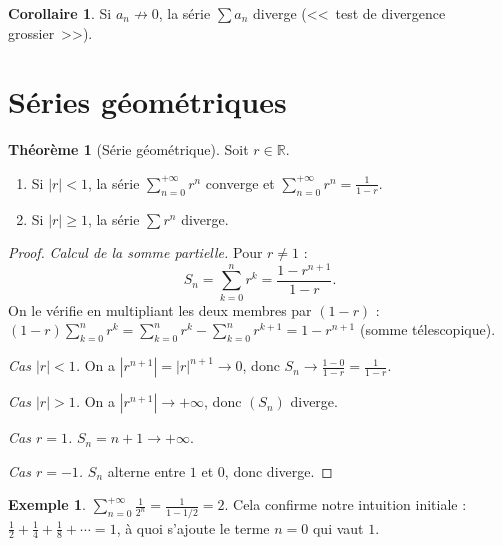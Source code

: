 \documentclass[12pt,a4paper,openany]{book}
\theoremstyle{definition}
\newtheorem{theoreme}{Théorème}[chapter]
\newtheorem{corollaire}{Corollaire}[chapter]
\newtheorem{exemple}{Exemple}[chapter]
\newcommand{\R}{\mathbb{R}}
\newcommand{\abs}[1]{\left\lvert #1 \right\rvert}
\begin{document}
\begin{corollaire}\label{cor:CN-test-divergence}
  Si $a_n \not\to 0$, la série $\sum a_n$ diverge (<<~test de divergence grossier~>>).
\end{corollaire}

\section{Séries géométriques}\label{sec:series:geometriques}

\begin{theoreme}[Série géométrique]\label{thm:serie-geometrique}
  Soit $r \in \R$.
  \begin{enumerate}[label=(\roman*)]
    \item Si $\abs{r} < 1$, la série $\sum_{n=0}^{+\infty} r^n$ converge et
      $\displaystyle\sum_{n=0}^{+\infty} r^n = \frac{1}{1 - r}$.
    \item Si $\abs{r} \geq 1$, la série $\sum r^n$ diverge.
  \end{enumerate}
\end{theoreme}

\begin{proof}
  \textit{Calcul de la somme partielle.} Pour $r \neq 1$ :
  \[
    S_n = \sum_{k=0}^{n} r^k = \frac{1 - r^{n+1}}{1 - r}.
  \]
  On le vérifie en multipliant les deux membres par $(1 - r)$ :
  $(1 - r)\sum_{k=0}^{n} r^k = \sum_{k=0}^{n} r^k - \sum_{k=0}^{n} r^{k+1}
  = 1 - r^{n+1}$ (somme télescopique).

  \textit{Cas $\abs{r} < 1$.} On a $\abs{r^{n+1}} = \abs{r}^{n+1} \to 0$, donc
  $S_n \to \frac{1 - 0}{1 - r} = \frac{1}{1 - r}$.

  \textit{Cas $\abs{r} > 1$.} On a $\abs{r^{n+1}} \to +\infty$, donc $(S_n)$ diverge.

  \textit{Cas $r = 1$.} $S_n = n + 1 \to +\infty$.

  \textit{Cas $r = -1$.} $S_n$ alterne entre $1$ et $0$, donc diverge.
\end{proof}

\begin{exemple}
  $\displaystyle\sum_{n=0}^{+\infty} \frac{1}{2^n} = \frac{1}{1 - 1/2} = 2$.
  Cela confirme notre intuition initiale : $\frac{1}{2} + \frac{1}{4} + \frac{1}{8} + \cdots = 1$,
  à quoi s'ajoute le terme $n=0$ qui vaut $1$.
\end{exemple}
\end{document}
